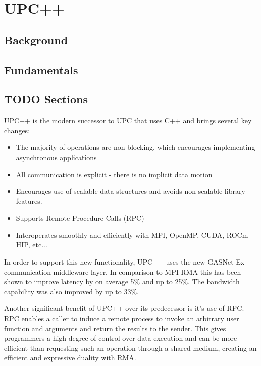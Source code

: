 \section{UPC++}

\subsection{Background}

\subsection{Fundamentals}

\subsection{TODO Sections}

UPC++ is the modern successor to UPC that uses C++ and brings several key changes\cite{UPC++_Performance}:
\begin{itemize}
    \item The majority of operations are non-blocking, which encourages implementing asynchronous applications
    \item All communication is explicit - there is no implicit data motion
    \item Encourages use of scalable data structures and avoids non-scalable library features.
    \item Supports Remote Procedure Calls (RPC)
    \item Interoperates smoothly and efficiently with MPI, OpenMP, CUDA, ROCm HIP, etc...
\end{itemize}



In order to support this new functionality, UPC++ uses the new GASNet-Ex communication middleware layer. In comparison to MPI RMA this has been shown to improve latency by on average 5\% and up to 25\%. The bandwidth capability was  also improved by up to 33\%\cite{UPC++_Performance}.

Another significant benefit of UPC++ over its predecessor is it's use of RPC. RPC enables a caller to induce a remote process to invoke an arbitrary user function and arguments and return the results to the sender\cite{UPC++_Programmers_Guide}. 
This gives programmers a high degree of control over data execution and can be more efficient than requesting such an operation through a shared medium, creating an efficient and expressive duality with RMA\cite{UPC++_Performance}.

